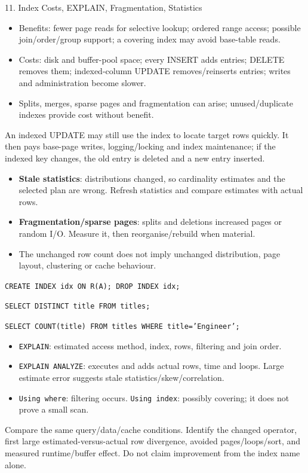 \begin{topic}{11. Index Costs, EXPLAIN, Fragmentation, Statistics}
\begin{itemize}
  \item Benefits: fewer page reads for selective lookup; ordered range access; possible join/order/group support; a covering index may avoid base-table reads.
  \item Costs: disk and buffer-pool space; every INSERT adds entries; DELETE removes them; indexed-column UPDATE removes/reinserts entries; writes and administration become slower.
  \item Splits, merges, sparse pages and fragmentation can arise; unused/duplicate indexes provide cost without benefit.
\end{itemize}
\why An indexed UPDATE may still use the index to locate target rows quickly. It then pays base-page writes, logging/locking and index maintenance; if the indexed key changes, the old entry is deleted and a new entry inserted.
\begin{itemize}
  \item \textbf{Stale statistics}: distributions changed, so cardinality estimates and the selected plan are wrong. Refresh statistics and compare estimates with actual rows.
  \item \textbf{Fragmentation/sparse pages}: splits and deletions increased pages or random I/O. Measure it, then reorganise/rebuild when material.
  \item The unchanged row count does not imply unchanged distribution, page layout, clustering or cache behaviour.
\end{itemize}
\texttt{CREATE INDEX idx ON R(A); \quad DROP INDEX idx;}

\texttt{SELECT DISTINCT title FROM titles;}

\texttt{SELECT COUNT(title) FROM titles WHERE title='Engineer';}
\begin{itemize}
  \item \texttt{EXPLAIN}: estimated access method, index, rows, filtering and join order.
  \item \texttt{EXPLAIN ANALYZE}: executes and adds actual rows, time and loops. Large estimate error suggests stale statistics/skew/correlation.
  \item \texttt{Using where}: filtering occurs. \texttt{Using index}: possibly covering; it does not prove a small scan.
\end{itemize}
\answer Compare the same query/data/cache conditions. Identify the changed operator, first large estimated-versus-actual row divergence, avoided pages/loops/sort, and measured runtime/buffer effect. Do not claim improvement from the index name alone.
\end{topic}


